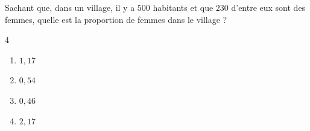 \begin{exo}{}
	Sachant que, dans un village, il y a $500$ habitants et que $230$ d'entre eux sont des femmes, quelle est la proportion de femmes dans le village ?

	\vspace*{-2mm}\begin{multicols}{4}
	\begin{enumerate}
		\item $1,17$
		\item $0,54$
		\item $0,46$
		\item $2,17$
	\end{enumerate}
	\end{multicols}\vspace*{-4mm}
\end{exo}
